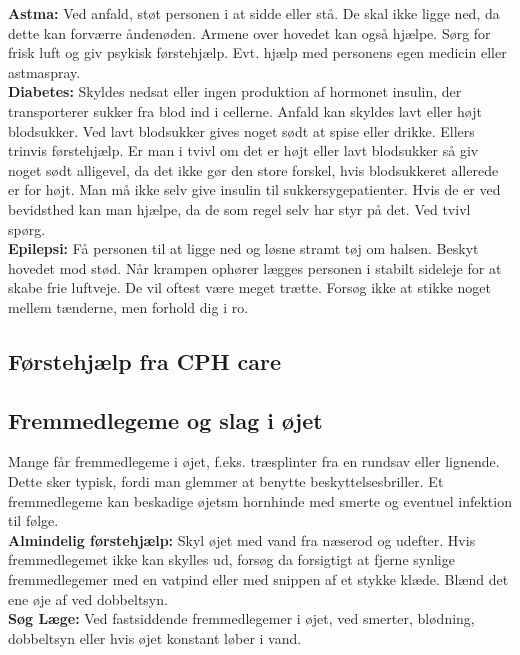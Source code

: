 \documentclass[../../../main.tex]{subfiles}
\begin{document}
\begin{multicols}{2}
\textbf{Astma:} Ved anfald, støt personen i at sidde eller stå. De skal ikke ligge ned, da dette kan forværre åndenøden. Armene over hovedet kan også hjælpe. Sørg for frisk luft og giv psykisk førstehjælp. Evt. hjælp med personens egen medicin eller astmaspray.
\\
\textbf{Diabetes:} Skyldes nedsat eller ingen produktion af hormonet insulin, der transporterer sukker fra blod ind i cellerne. Anfald kan skyldes lavt eller højt blodsukker. Ved lavt blodsukker gives noget sødt at spise eller drikke. Ellers trinvis førstehjælp. Er man i tvivl om det er højt eller lavt blodsukker så giv noget sødt alligevel, da det ikke gør den store forskel, hvis blodsukkeret allerede er for højt. Man må ikke selv give insulin til sukkersygepatienter. Hvis de er ved bevidsthed kan man hjælpe, da de som regel selv har styr på det. Ved tvivl spørg.
\\
\textbf{Epilepsi:} Få personen til at ligge ned og løsne stramt tøj om halsen. Beskyt hovedet mod stød. Når krampen ophører lægges personen i stabilt sideleje for at skabe frie luftveje. De vil oftest være meget trætte. Forsøg ikke at stikke noget mellem tænderne, men forhold dig i ro.

\clearpage

\subsection{Førstehjælp fra CPH care}

\subsection*{Fremmedlegeme og slag i øjet} Mange får fremmedlegeme i øjet, f.eks. træsplinter fra en rundsav eller lignende. Dette sker typisk, fordi man glemmer at benytte beskyttelsesbriller. Et fremmedlegeme kan beskadige øjetsm hornhinde med smerte og eventuel infektion til følge.
\\

\textbf{Almindelig førstehjælp:}
Skyl øjet med vand fra næserod og udefter. Hvis fremmedlegemet ikke kan skylles ud, forsøg da forsigtigt at fjerne synlige fremmedlegemer med en vatpind eller med snippen af et stykke klæde. Blænd det ene øje af ved dobbeltsyn.
\\

\textbf{Søg Læge:}
Ved fastsiddende fremmedlegemer i øjet, ved smerter, blødning, dobbeltsyn eller hvis øjet konstant løber i vand.
\\


\end{multicols}
\end{document}
